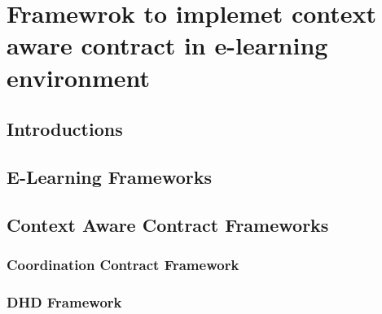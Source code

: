 \chapter{Framewrok to implemet context aware contract in e-learning environment}


\section{Introductions}
\section{E-Learning Frameworks}
\section{Context Aware Contract Frameworks}
\subsection{Coordination Contract Framework}
\subsection{DHD Framework}